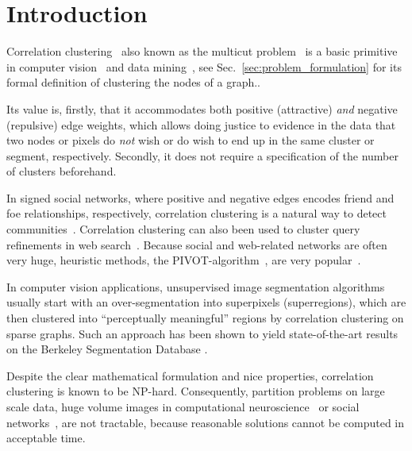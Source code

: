 \section{Introduction}
Correlation clustering~\cite{Bansal-2002} also known as the multicut problem~\cite{chopra_1993_mp} 
is a basic primitive in computer vision~\cite{andres_2011_iccv,kroeger_2012_eccv,yarkony_2012_eccv,alush_2013_simbad} and data mining~\cite{Chierichetti-2014,Arasu-2009,Sadikov-2010,Chen-2012},
see Sec.~\ref{sec:problem_formulation} for its formal definition of clustering the nodes of a graph..
 
Its value is, firstly, that it accommodates both positive (attractive) \emph{and} negative (repulsive) edge weights,
which allows doing justice to evidence in the data that two nodes or pixels do \emph{not} wish  or do wish to end up in the same cluster or segment, respectively.
Secondly, it does not require a specification of the number of clusters beforehand.


In signed social networks, where positive and negative edges encodes friend and foe relationships, respectively,
correlation clustering is a natural way to detect communities~\cite{Chierichetti-2014,Chen-2012}.
Correlation clustering can also been used to cluster query refinements in web search~\cite{Sadikov-2010}.
Because social and web-related networks are often very huge, heuristic methods, \eg the PIVOT-algorithm~\cite{Ailon-2008},
are very popular~\cite{Chierichetti-2014}.

In computer vision applications, unsupervised image segmentation algorithms usually start with an over-segmentation
into superpixels (superregions), which are then clustered into ``perceptually meaningful''
regions by correlation clustering on sparse graphs.
Such an approach has been shown to yield
state-of-the-art results on the Berkeley Segmentation Database
\cite{andres_2011_iccv,yarkony_2012_eccv,alush_2013_simbad}.

Despite the clear mathematical formulation and nice properties,
correlation clustering is known to be NP-hard. 
%
Consequently, partition problems on large scale data, \eg
huge volume images in computational neuroscience~\cite{kroeger_2012_eccv}
or social networks~\cite{Leskovec-2010}, 
are not tractable, because reasonable solutions cannot be computed in acceptable time.


